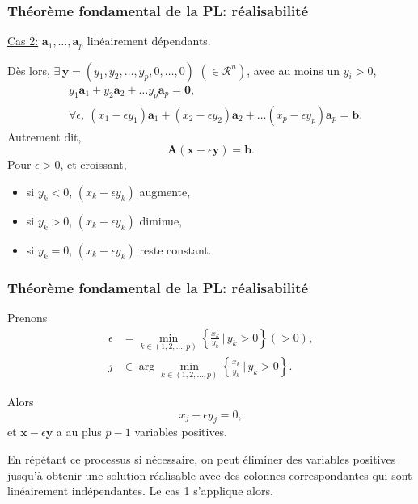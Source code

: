 \documentclass[usepdftitle=false]{beamer}
\def\ba{\boldsymbol{a}}
\def\bb{\boldsymbol{b}}
\def\bx{\boldsymbol{x}}
\def\by{\boldsymbol{y}}
\def\bA{\boldsymbol{A}}
\def\bzero{\boldsymbol{0}}
\begin{document}
\begin{frame}
\frametitle{Théorème fondamental de la PL: réalisabilité}

\underline{Cas 2:} $\ba_1,\ldots,\ba_p$ linéairement dépendants.

Dès lors, $\exists\, \by = (y_1, y_2,\ldots, y_p,0,\ldots,0)$ $(\in \mathcal{R}^n)$, avec au moins un $y_i > 0$,
\begin{align*}
&y_1 \ba_1 + y_2 \ba_2 + \ldots y_p \ba_p = \bzero, \\
& \forall \epsilon, \ (x_1 - \epsilon y_1) \ba_1 + (x_2 - \epsilon y_2) \ba_2 + \ldots (x_p - \epsilon y_p) \ba_p = \bb.
\end{align*}
Autrement dit,
\[
\bA(\bx-\epsilon \by) = \bb.
\]
Pour $\epsilon > 0$, et croissant,
\begin{itemize}
\item 
si $y_k < 0$, $(x_k - \epsilon y_k)$ augmente,
\item 
si $y_k > 0$, $(x_k - \epsilon y_k)$ diminue,
\item 
si $y_k = 0$, $(x_k - \epsilon y_k)$ reste constant.
\end{itemize}
\end{frame}

\begin{frame}
\frametitle{Théorème fondamental de la PL: réalisabilité}

Prenons
\begin{align*}
\epsilon &= \min_{k \in (1,2,\ldots,p)} \left\lbrace \frac{x_k}{y_k} \,\bigg|\, y_k > 0 \right\rbrace (> 0), \\
j &\in \arg \min_{k \in (1,2,\ldots,p)} \left\lbrace \frac{x_k}{y_k} \,\bigg|\, y_k > 0 \right\rbrace.
\end{align*}

Alors
$$
x_j - \epsilon y_j = 0,
$$
et $\bx - \epsilon\by$ a au plus $p-1$ variables positives.

\mbox{}

En répétant ce processus si nécessaire, on peut éliminer des variables positives jusqu'à obtenir une solution réalisable avec des colonnes correspondantes qui sont linéairement indépendantes. Le cas 1 s'applique alors.

\end{frame}
\end{document}
